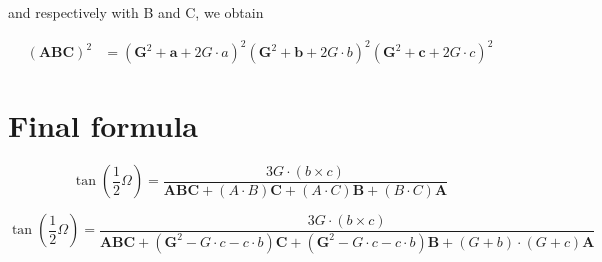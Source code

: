 \documentclass[10pt,a4paper]{article}
\begin{document}
and respectively with B and C, we obtain


\begin{align}
(\mathbf{A}\mathbf{B}\mathbf{C})^2 &= (\mathbf{G}^2 + \mathbf{a} + 2 G \cdot a )^2(\mathbf{G}^2 + \mathbf{b} + 2 G \cdot b)^2(\mathbf{G}^2 + \mathbf{c} + 2 G \cdot c)^2 
\end{align}


\section{Final formula}


$$
{\displaystyle \tan \left({\frac {1}{2}}\Omega \right)
  = {\frac {3 G \cdot \left( b \times c \right)}
    {\mathbf{A}\mathbf{B}\mathbf{C} + \left({A}\cdot {B}\right)\mathbf{C}
      + \left({A}\cdot {C}\right)\mathbf{B}
      + \left({B}\cdot {C}\right)\mathbf{A}}}}
$$


$$
{\displaystyle \tan \left({\frac {1}{2}}\Omega \right)
  = {\frac {3 G \cdot \left( b \times c \right)}
    {\mathbf{A}\mathbf{B}\mathbf{C} +
    (\mathbf{G}^2 - G \cdot c - c \cdot b)\mathbf{C}
      + (\mathbf{G}^2 - G \cdot c - c \cdot b)\mathbf{B}
      + \left( G + b \right) \cdot \left( G + c \right) \mathbf{A}
      }}}
$$
\end{document}
